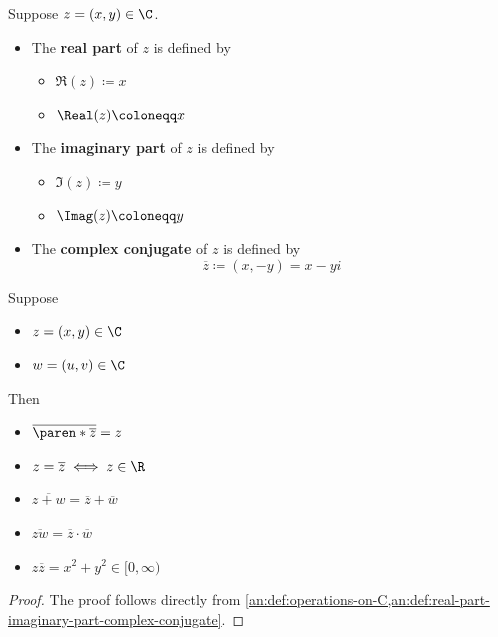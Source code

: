 \bigskip

\begin{definition} \label{an:def:real-part-imaginary-part-complex-conjugate}
  Suppose $z = (x, y) \in \C$.
  \begin{itemize}
    \item The \textbf{real part} of $z$ is defined by
          \begin{itemize}
            \item $\Re(z) \coloneqq x$
            \item $\Real(z) \coloneqq x$
          \end{itemize}
    \item The \textbf{imaginary part} of $z$ is defined by
          \begin{itemize}
            \item $\Im(z) \coloneqq y$
            \item $\Imag(z) \coloneqq y$
          \end{itemize}
    \item The \textbf{complex conjugate} of $z$ is defined by
          \[
            \overline{z} \coloneqq (x, -y) = x - yi
          \]
  \end{itemize}
\end{definition}

\bigskip

\begin{theorem} \label{an:thm:properties-of-complex-conjugate}
  Suppose
  \begin{itemize}
    \item $z = (x, y) \in \C$
    \item $w = (u, v) \in \C$
  \end{itemize}
  Then
  \begin{itemize}
    \item $\overline{\paren*{\overline{z}}} = z$
    \item $z = \overline{z} \iff z \in \R$
    \item $\overline{z + w} = \overline{z} + \overline{w}$
    \item $\overline{zw} = \overline{z} \cdot \overline{w}$
    \item $z\overline{z} = x^{2} + y^{2} \in [0, \infty)$
  \end{itemize}
\end{theorem}

\begin{proof}
  The proof follows directly from \cref{an:def:operations-on-C,an:def:real-part-imaginary-part-complex-conjugate}.
\end{proof}

